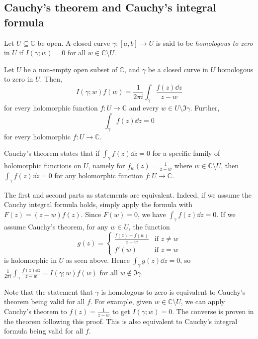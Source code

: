 \subsection{Cauchy's theorem and Cauchy's integral formula}
\begin{definition}
	Let \( U \subseteq \mathbb C \) be open.
	A closed curve \( \gamma \colon [a,b] \to U \) is said to be \textit{homologous to zero} in \( U \) if \( I(\gamma; w) = 0 \) for all \( w \in \mathbb C \setminus U \).
\end{definition}
\begin{theorem}
	Let \( U \) be a non-empty open subset of \( \mathbb C \), and \( \gamma \) be a closed curve in \( U \) homologous to zero in \( U \).
	Then,
	\[
		I(\gamma;w) f(w) = \frac{1}{2\pi i} \int_\gamma \frac{f(z) \dd{z}}{z-w}
	\]
	for every holomorphic function \( f \colon U \to \mathbb C \) and every \( w \in U \setminus \Im \gamma \).
	Further,
	\[
		\int_\gamma f(z) \dd{z} = 0
	\]
	for every holomorphic \( f \colon U \to \mathbb C \).
\end{theorem}
\begin{remark}
	Cauchy's theorem states that if \( \int_\gamma f(z) \dd{z} = 0 \) for a specific family of holomorphic functions on \( U \), namely for \( f_w(z) = \frac{1}{z-w} \) where \( w \in \mathbb C \setminus U \), then \( \int_\gamma f(z) \dd{z} = 0 \) for any holomorphic function \( f \colon U \to \mathbb C \).

	The first and second parts as statements are equivalent.
	Indeed, if we assume the Cauchy integral formula holds, simply apply the formula with \( F(z) = (z-w)f(z) \).
	Since \( F(w) = 0 \), we have \( \int_\gamma f(z) \dd{z} = 0 \).
	If we assume Cauchy's theorem, for any \( w \in U \), the function
	\[
		g(z) = \begin{cases}
			\frac{f(z) - f(w)}{z-w} & \text{if } z \neq w \\
			f'(w)                   & \text{if } z = w
		\end{cases}
	\]
	is holomorphic in \( U \) as seen above.
	Hence \( \int_\gamma g(z) \dd{z} = 0 \), so \( \frac{1}{2\pi i} \int_\gamma \frac{f(z) \dd{z}}{z-w} = I(\gamma;w) f(w) \) for all \( w \not\in \Im \gamma \).

	Note that the statement that \( \gamma \) is homologous to zero is equivalent to Cauchy's theorem being valid for all \( f \).
	For example, given \( w \in \mathbb C \setminus U \), we can apply Cauchy's theorem to \( f(z) = \frac{1}{z-w} \) to get \( I(\gamma;w) = 0 \).
	The converse is proven in the theorem following this proof.
	This is also equivalent to Cauchy's integral formula being valid for all \( f \).
\end{remark}

